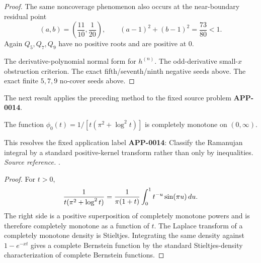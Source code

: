\begin{proof}
The same noncoverage phenomenon also occurs at the near-boundary residual point
\[
(a,b)=\left(\frac{11}{10},\frac1{20}\right),
\qquad
(a-1)^2+(b-1)^2=\frac{73}{80}<1.
\]
Again \(Q_5,Q_7,Q_9\) have no positive roots and are positive at \(0\).

The derivative-polynomial normal form for \(h^{(n)}\).
The odd-derivative small-\(x\) obstruction criterion.
The exact fifth/seventh/ninth negative seeds above.
The exact finite \(5,7,9\) no-cover seeds above.
\end{proof}

The next result applies the preceding method to the fixed source problem \textbf{APP-0014}.
\begin{theorem}
\label{res:ramanujan-density-logsquare-cm}
The function \(\phi_0(t)=1/[t(\pi^2+\log^2 t)]\) is completely monotone on \((0,\infty)\).

This resolves the fixed application label \textbf{APP-0014}: Classify the Ramanujan integral by a standard positive-kernel transform rather than only by inequalities.
\emph{Source reference.} \cite{app-app-0014-source}.
\end{theorem}
\begin{proof}
For \(t>0\),
\[
 {1\over t(\pi^2+\log^2t)}
   ={1\over \pi(1+t)}\int_0^1 t^{-u}\sin(\pi u)\,du .
\]
The right side is a positive superposition of completely monotone powers and is
therefore completely monotone as a function of \(t\).  The Laplace transform of
a completely monotone density is Stieltjes.  Integrating the same density
against \(1-e^{-xt}\) gives a complete Bernstein function by the standard
Stieltjes-density characterization of complete Bernstein functions.
\end{proof}

